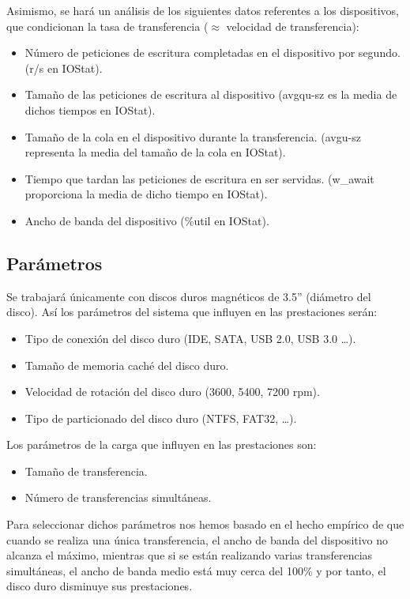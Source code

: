 \documentclass[a4paper,10pt]{article}
\renewcommand{\texttt}[2][black!60]{\textcolor{#1}{\ttfamily #2}}
\begin{document}
 Asimismo, se hará un análisis de los siguientes datos referentes a los dispositivos, que condicionan la tasa de transferencia
 ($\approx$ velocidad de transferencia):
\begin{itemize}
 \item Número de peticiones de escritura completadas en el dispositivo por segundo. (\texttt{r/s} en IOStat).
 \item Tamaño de las peticiones de escritura al dispositivo (\texttt{avgqu-sz} es la media de dichos tiempos en
 IOStat).
 \item Tamaño de la cola en el dispositivo durante la transferencia. (\texttt{avgu-sz} representa la media del
 tamaño de la cola en IOStat).
 \item Tiempo que tardan las peticiones de escritura en ser servidas. (\texttt{w\_await} proporciona la media
 de dicho tiempo en IOStat).
 \item Ancho de banda del dispositivo (\texttt{\%util} en IOStat).
\end{itemize}

\subsection{Parámetros}
Se trabajará únicamente con discos duros magnéticos de 3.5'' (diámetro del disco).
Así los parámetros del sistema que influyen en las prestaciones serán:
\begin{itemize}
 \item Tipo de conexión del disco duro (IDE, SATA, USB 2.0, USB 3.0 \ldots).
 \item Tamaño de memoria caché del disco duro.
 \item Velocidad de rotación del disco duro (3600, 5400, 7200 rpm).
 \item Tipo de particionado del disco duro (NTFS, FAT32, \ldots).
 
 \cite{hddparam}
\end{itemize}

Los parámetros de la carga que influyen en las prestaciones son:
\begin{itemize}
 \item Tamaño de transferencia.
 \item Número de transferencias simultáneas.
\end{itemize}
Para seleccionar dichos parámetros nos hemos basado en el hecho empírico de que cuando se realiza una única transferencia,
el ancho de banda del dispositivo no alcanza el máximo, mientras que si se están realizando varias transferencias
simultáneas, el ancho de banda medio está muy cerca del 100\% y por tanto, el disco duro disminuye sus prestaciones.
\end{document}
